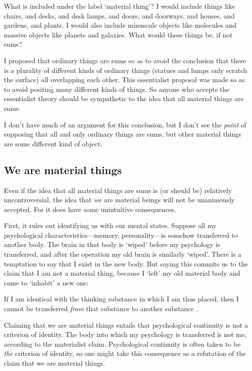 \documentclass[11pt]{article}
\newenvironment{squote}{%
\begin{spacing}{1}
\begin{list}{}{%
\setlength{\labelwidth}{0pt}%
\rightmargin\leftmargin%
}
\item\relax
}{%
\end{list}%
\end{spacing}
}
\begin{document}
\begin{spacing}{1.5}
What is included under the label `material thing'?  I would include
things like chairs, and desks, and desk lamps, and doors, and
doorways, and houses, and gardens, and plants.  I would also include
minuscule objects like molecules and massive objects like planets and
galaxies.  What would these things be, if not sums?

I proposed that ordinary things are sums so as to avoid the conclusion
that there is a plurality of different kinds of ordinary things
(statues and lumps only scratch the surface) all overlapping each
other.  This essentialist proposal was made so as to avoid positing
many different kinds of things.  So anyone who accepts the
essentialist theory should be sympathetic to the idea that all
material things are sums.

I don't have much of an argument for this conclusion, but I don't see
the {\em point} of supposing that all and only ordinary things are
sums, but other material things are some different kind of object.

\subsection{We are material things}
\label{material-beings}
Even if the idea that all material things are sums is (or should be)
relatively uncontroversial, the idea that {\em we} are material beings
will not be unanimously accepted.  For it does have some unintuitive
consequences.  

First, it rules out identifying us with our mental states.  Suppose
all my psychological characteristics---memory, personality---is
somehow transferred to another body.  The brain in that body is
`wiped' before my psychology is transferred, and after the operation
my old brain is similarly `wiped'.  There is a temptation to say that
I exist in the new body.  But saying this commits us to the claim that
I am not a material thing, because I `left' my old material body and
came to `inhabit' a new one:

\begin{squote}
 If I am identical with the thinking substance in which I am thus
 placed, then I cannot be transferred {\em from} that substance to
 another substance \citep[107]{chisholm1979}.
\end{squote}

Claiming that we are material things entails that psychological
continuity is not a criterion of identity.  The body into which my
psychology is transferred is not me, according to the materialist
claim.  Psychological continuity is often taken to be {\em the}
criterion of identity, so one might take this consequence as a
refutation of the claim that we are material things.


\end{spacing}
\end{document}
